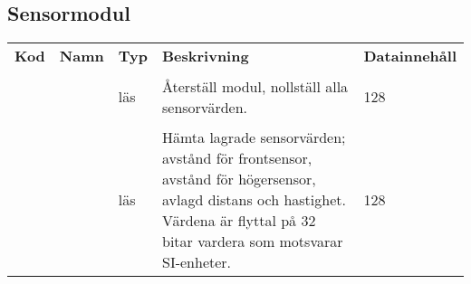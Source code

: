 \documentclass{tekniskrapport/tech.tex}
\makeatletter
\newenvironment{cmdlist}
{
    \renewcommand{\arraystretch}{1.5}
    \begin{table}[H]
        \centering
        \setlength{\tabcolsep}{8pt}
        \begin{tabular}{@{}m{1cm}m{1cm}m{1cm}m{6cm}m{8cm}}
            \bfseries Kod &
            \bfseries Namn &
            \bfseries Typ &
            \bfseries Beskrivning &
            \bfseries Datainnehåll \\
}{
        \end{tabular}
    \end{table}
}
\newcommand{\cmd}[5]{
    \mono{0x#1} & \mono{#2} & #3 & #4 &
    {\begin{bytefield}[bitwidth=0.4mm]{128}
    #5
    \end{bytefield}}\\
}
\makeatother
\begin{document}
\subsection{Sensormodul}

\begin{cmdlist}
\cmd{01}{RST}{läs}{Återställ modul, nollställ alla sensorvärden.}{
    \emptybox{8}\emptybox{8}\emptybox{8}\emptybox{8}
    \emptybox{8}\emptybox{8}\emptybox{8}\emptybox{8}
    \emptybox{8}\emptybox{8}\emptybox{8}\emptybox{8}
    \emptybox{8}\emptybox{8}\emptybox{8}\emptybox{8}
}
\cmd{03}{GET}{läs}{Hämta lagrade sensorvärden; avstånd för frontsensor, avstånd
    för högersensor, avlagd distans och hastighet. Värdena är flyttal på 32
    bitar vardera som motsvarar SI-enheter.}{
    \bitbox{32}{$d_f$}
    \bitbox{32}{$d_r$}
    \bitbox{32}{$d$}
    \bitbox{32}{$v$}
}
\end{cmdlist}
\end{document}
